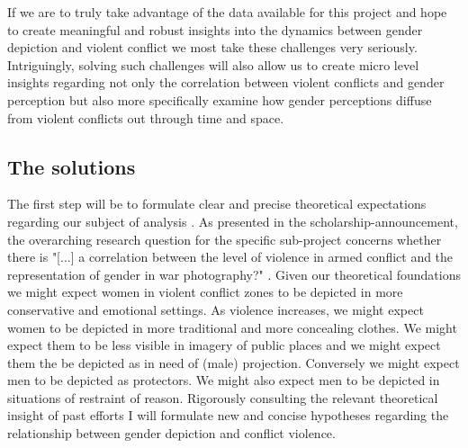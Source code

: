 \documentclass[a4paper]{article}
\begin{document}
If we are to truly take advantage of the data available for this project and hope to create meaningful and robust insights into the dynamics between gender depiction and violent conflict we most take these challenges very seriously. Intriguingly, solving such challenges will also allow us to create micro level insights regarding not only the correlation between violent conflicts and gender perception but also more specifically examine how gender perceptions diffuse from violent conflicts out through time and space.\par


\subsection{The solutions}

The first step will be to formulate clear and precise theoretical expectations regarding our subject of analysis \cite[30-53]{Cederman_Gleditsch_Buhaug_2013}. As presented in the scholarship-announcement, the overarching research question for the specific sub-project concerns whether there is "[...] a correlation between the level of violence in armed conflict and the representation of gender in war photography?" \citep{bodies}. Given our theoretical foundations we might expect women in violent conflict zones to be depicted in more conservative and emotional settings. As violence increases, we might expect women to be depicted in more traditional and more concealing clothes. We might expect them to be less visible in imagery of public places and we might expect them the be depicted as in need of (male) projection. Conversely we might expect men to be depicted as protectors. We might also expect men to be depicted in situations of restraint of reason. 
Rigorously consulting the relevant theoretical insight of past efforts I will formulate new and concise hypotheses regarding the relationship between gender depiction and conflict violence.\par 
\end{document}

